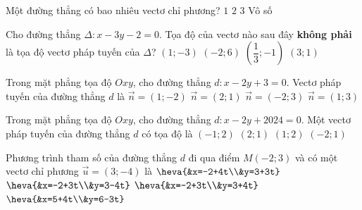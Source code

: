 

\begin{ex}%
	Một đường thẳng có  bao nhiêu vectơ chỉ phương?
	\choice 
		{$1$} 
		{$2$} 
		 {$3$}
		{\True Vô  số}
	\loigiai{} 
\end{ex}

\begin{ex}%
	Cho đường thẳng $\Delta\colon x-3y-2=0$. Tọa độ của vectơ nào sau đây \textbf{không phải} là tọa độ vectơ pháp tuyến của  $\Delta$?
	\choice 
		 {$(1;-3)$}
		{$(-2;6)$} 
		{$\left(  \dfrac{1}{3};-1\right) $}
		{\True $(3;1)$} 
\end{ex}

\begin{ex}%
	Trong mặt phẳng tọa độ $Oxy$,  cho đường thẳng $d\colon x-2y+3=0$. Vectơ pháp tuyến của đường thẳng $d$ là
	\choice 
		 {\True $\overrightarrow{n}=(1;-2)$}
		 {$\overrightarrow{n}=(2; 1)$}
		{$\overrightarrow{n}=(-2; 3)$} 
		{$\overrightarrow{n}=(1;  3)$}
\end{ex}

\begin{ex}%
	Trong mặt phẳng tọa độ $Oxy$,  cho đường thẳng $d\colon x-2y+2024=0$. Một vectơ pháp tuyến của đường thẳng $d$ có tọa độ là
	\choice 
		{\True $(-1;  2)$}
		{$(2;  1)$}
		{$(1;  2)$}
		{$(-2;  1)$}
\end{ex}

\begin{ex}%
	 Phương trình tham số của đường thẳng $d$ đi qua điểm $M(-2;3)$ và có một vectơ chỉ phương $\overrightarrow{u}=(3;-4)$ là
	 \choice
		{$\heva{&x=-2+4t\\&y=3+3t}$} 
		{\True  $\heva{&x=-2+3t\\&y=3-4t}$}
		{$\heva{&x=-2+3t\\&y=3+4t}$} 
		 {$\heva{&x=5+4t\\&y=6-3t}$}
\end{ex}

